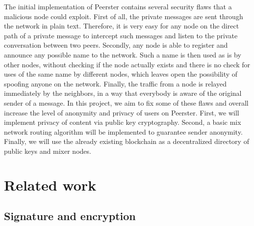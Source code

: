 \documentclass[11pt, a4paper]{article}
\begin{document}
    The initial implementation of Peerster contains several security flaws that a malicious node could exploit.
    First of all, the private messages are sent through the network in plain text.
    Therefore, it is very easy for any node on the direct path of a private message to intercept such messages and listen to the private conversation between two peers.
    Secondly, any node is able to register and announce any possible name to the network.
    Such a name is then used as is by other nodes, without checking if the node actually exists and there is no check for uses of the same name by different nodes, which leaves open the possibility of spoofing anyone on the network.
    Finally, the traffic from a node is relayed immediately by the neighbors, in a way that everybody is aware of the original sender of a message.
    In this project, we aim to fix some of these flaws and overall increase the level of anonymity and privacy of users on Peerster.
    First, we will implement privacy of content via public key cryptography.
    Second, a basic mix network routing algorithm will be implemented to guarantee sender anonymity.
    Finally, we will use the already existing blockchain as a decentralized directory of public keys and mixer nodes.




\section{Related work}

    \subsection{Signature and encryption}
\end{document}
